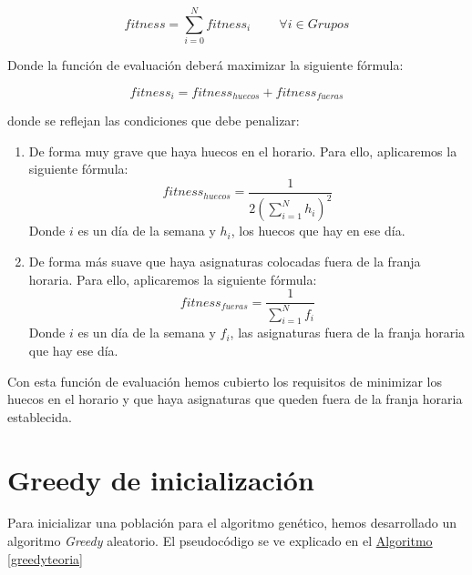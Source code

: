 \begin{displaymath}
    fitness = \sum_{i=0}^N fitness_i \qquad\ \forall i \in Grupos
\end{displaymath}

Donde la función de evaluación deberá maximizar la siguiente fórmula:

\begin{displaymath}
    fitness_i = fitness_{huecos} + fitness_{fueras}
\end{displaymath}

donde se reflejan las condiciones que debe penalizar:

\begin{enumerate}[---]
    \item De forma muy grave que haya huecos en el horario. Para ello, aplicaremos la siguiente fórmula:
    \begin{displaymath}
        fitness_{huecos} = \frac{1}{2 \left( \sum_{i = 1}^N h_i \right)^2}
    \end{displaymath}
    Donde $i$ es un día de la semana y $h_i$, los huecos que hay en ese día.
    
    \item De forma más suave que haya asignaturas colocadas fuera de la franja horaria. Para ello, aplicaremos la siguiente fórmula:
    \begin{displaymath}
        fitness_{fueras} = \frac{1}{\sum_{i=1}^N f_i}
    \end{displaymath}
    Donde $i$ es un día de la semana y $f_i$, las asignaturas fuera de la franja horaria que hay ese día.
\end{enumerate}

Con esta función de evaluación hemos cubierto los requisitos de minimizar los huecos en el horario y que haya asignaturas que queden fuera de la franja horaria establecida.

\section{Greedy de inicialización}
Para inicializar una población para el algoritmo genético, hemos desarrollado un algoritmo \textit{Greedy} aleatorio. El pseudocódigo se ve explicado en el \hyperref[greedyteoria]{Algoritmo \ref*{greedyteoria}} 

